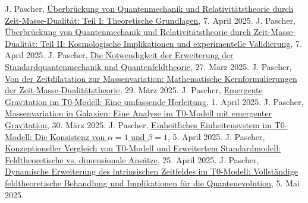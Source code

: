 \documentclass[12pt,a4paper]{article}
\begin{document}
	
	\begin{thebibliography}{99}
		 J. Pascher, \href{https://github.com/jpascher/T0-Time-Mass-Duality/tree/main/2/pdf/Deutsch/QMRelZeitMasseTeil1.pdf}{Überbrückung von Quantenmechanik und Relativitätstheorie durch Zeit-Masse-Dualität: Teil I: Theoretische Grundlagen}, 7. April 2025.
		 J. Pascher, \href{https://github.com/jpascher/T0-Time-Mass-Duality/tree/main/2/pdf/Deutsch/QMRelZeitMasseTeil2.pdf}{Überbrückung von Quantenmechanik und Relativitätstheorie durch Zeit-Masse-Dualität: Teil II: Kosmologische Implikationen und experimentelle Validierung}, 7. April 2025.
		 J. Pascher, \href{https://github.com/jpascher/T0-Time-Mass-Duality/tree/main/2/pdf/Deutsch/NotwendigkeitQMErweiterung.pdf}{Die Notwendigkeit der Erweiterung der Standardquantenmechanik und Quantenfeldtheorie}, 27. März 2025.
		 J. Pascher, \href{https://github.com/jpascher/T0-Time-Mass-Duality/tree/main/2/pdf/Deutsch/MathZeitMasseLagrange.pdf}{Von der Zeitdilatation zur Massenvariation: Mathematische Kernformulierungen der Zeit-Masse-Dualitätstheorie}, 29. März 2025.
		 J. Pascher, \href{https://github.com/jpascher/T0-Time-Mass-Duality/tree/main/2/pdf/Deutsch/EmergentGravT0.pdf}{Emergente Gravitation im T0-Modell: Eine umfassende Herleitung}, 1. April 2025.
		 J. Pascher, \href{https://github.com/jpascher/T0-Time-Mass-Duality/tree/main/2/pdf/Deutsch/MassVarGalaxien.pdf}{Massenvariation in Galaxien: Eine Analyse im T0-Modell mit emergenter Gravitation}, 30. März 2025.
		 J. Pascher, \href{https://github.com/jpascher/T0-Time-Mass-Duality/tree/main/2/pdf/Deutsch/Alpha1Beta1Konsistenz.pdf}{Einheitliches Einheitensystem im T0-Modell: Die Konsistenz von $\alpha = 1$ und $\beta = 1$}, 5. April 2025.
		 J. Pascher, \href{https://github.com/jpascher/T0-Time-Mass-Duality/tree/main/2/pdf/Deutsch/T0vsESM_KonzeptuelleAnalyse.pdf}{Konzeptioneller Vergleich von T0-Modell und Erweitertem Standardmodell: Feldtheoretische vs. dimensionale Ansätze}, 25. April 2025.
		 J. Pascher, \href{https://github.com/jpascher/T0-Time-Mass-Duality/tree/main/2/pdf/Deutsch/DynamischesTF-SchrodingerErweiterungen.pdf}{Dynamische Erweiterung des intrinsischen Zeitfeldes im T0-Modell: Vollständige feldtheoretische Behandlung und Implikationen für die Quantenevolution}, 5. Mai 2025.

\end{thebibliography}
\end{document}
